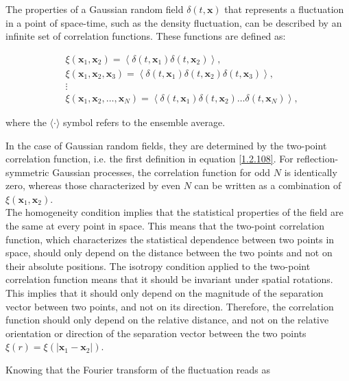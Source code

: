 The properties of a Gaussian random field $\delta(t, \mathbf{x})$ that represents a fluctuation in a point of space-time, such as the density fluctuation, can be described by an infinite set of correlation functions. These functions are defined as:

\begin{align}
    &\xi\left(\mathbf{x}_{1}, \mathbf{x}_{2}\right)= \left\langle\delta\left(t, \mathbf{x}_{1}\right) \delta\left(t, \mathbf{x}_{2}\right)\right\rangle, \label{1.2.108}\\
    &\xi\left(\mathbf{x}_{1}, \mathbf{x}_{2}, \mathbf{x}_{3}\right) = \left\langle\delta\left(t, \mathbf{x}_{1}\right) \delta\left(t, \mathbf{x}_{2}\right) \delta\left(t, \mathbf{x}_{3}\right)\right\rangle, \\
    & \vdots \\
    &\xi\left(\mathbf{x}_{1}, \mathbf{x}_{2}, \ldots, \mathbf{x}_{N}\right) =\left\langle\delta\left(t, \mathbf{x}_{1}\right) \delta\left(t, \mathbf{x}_{2}\right) \ldots \delta\left(t, \mathbf{x}_{N}\right)\right\rangle,
\end{align}


where the $\langle\cdot\rangle$ symbol refers to the ensemble average.

In the case of Gaussian random fields, they are determined by the two-point correlation function, i.e. the first definition in equation \eqref{1.2.108}. For reflection-symmetric Gaussian processes, the correlation function for odd $N$ is identically zero, whereas those characterized by even $N$ can be written as a combination of $\xi\left(\mathbf{x}_{1}, \mathbf{x}_{2}\right)$.\\
 The homogeneity condition implies that the statistical properties of the field are the same at every point in space. This means that the two-point correlation function, which characterizes the statistical dependence between two points in space, should only depend on the distance between the two points and not on their absolute positions. The isotropy condition applied to the two-point correlation function means that it should be invariant under spatial rotations. This implies that it should only depend on the magnitude of the separation vector between two points, and not on its direction. Therefore, the correlation function should only depend on the relative distance, and not on the relative orientation or direction of the separation vector between the two points $\xi(r)=\xi\left(\left|\mathbf{x}_{1}-\mathbf{x}_{2}\right|\right)$.

Knowing that the Fourier transform of the fluctuation reads as

